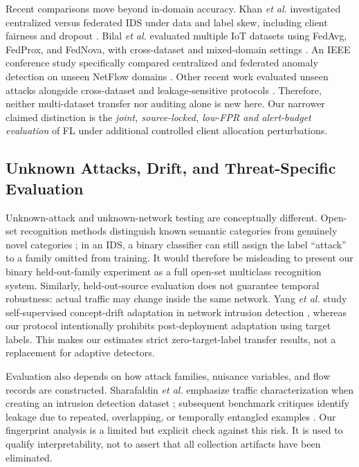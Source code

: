 \documentclass[journal,10pt]{IEEEtran}
\begin{document}
Recent comparisons move beyond in-domain accuracy. Khan \emph{et al.} investigated centralized versus federated IDS under data and label skew, including client fairness and dropout \cite{khan2025}. Bilal \emph{et al.} evaluated multiple IoT datasets using FedAvg, FedProx, and FedNova, with cross-dataset and mixed-domain settings \cite{bilal2026}. An IEEE conference study specifically compared centralized and federated anomaly detection on unseen NetFlow domains \cite{softcom2026}. Other recent work evaluated unseen attacks alongside cross-dataset and leakage-sensitive protocols \cite{leakage2026}. Therefore, neither multi-dataset transfer nor auditing alone is new here. Our narrower claimed distinction is the \emph{joint, source-locked, low-FPR and alert-budget evaluation} of FL under additional controlled client allocation perturbations.

\subsection{Unknown Attacks, Drift, and Threat-Specific Evaluation}
Unknown-attack and unknown-network testing are conceptually different. Open-set recognition methods distinguish known semantic categories from genuinely novel categories \cite{bendale2016}; in an IDS, a binary classifier can still assign the label ``attack'' to a family omitted from training. It would therefore be misleading to present our binary held-out-family experiment as a full open-set multiclass recognition system. Similarly, held-out-source evaluation does not guarantee temporal robustness: actual traffic may change inside the same network. Yang \emph{et al.} study self-supervised concept-drift adaptation in network intrusion detection \cite{yang2025}, whereas our protocol intentionally prohibits post-deployment adaptation using target labels. This makes our estimates strict zero-target-label transfer results, not a replacement for adaptive detectors.

Evaluation also depends on how attack families, nuisance variables, and flow records are constructed. Sharafaldin \emph{et al.} emphasize traffic characterization when creating an intrusion detection dataset \cite{sharafaldin2018}; subsequent benchmark critiques identify leakage due to repeated, overlapping, or temporally entangled examples \cite{arp2022,pendlebury2019}. Our fingerprint analysis is a limited but explicit check against this risk. It is used to qualify interpretability, not to assert that all collection artifacts have been eliminated.
\end{document}
